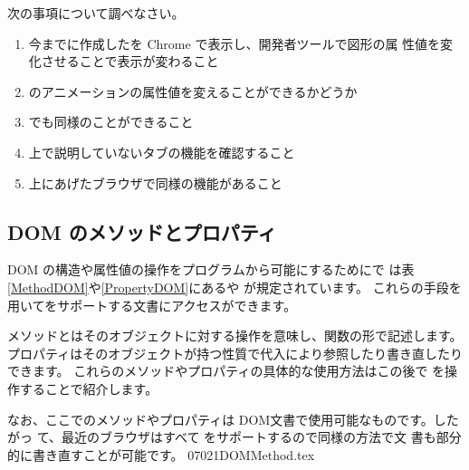\begin{Problem}\upshape
次の事項について調べなさい。
\begin{enumerate}
 \item  今までに作成した\SVG を Chrome で表示し、開発者ツールで図形の属
	性値を変化させることで表示が変わること
 \item \SVG のアニメーションの属性値を変えることができるかどうか
 \item \HTML でも同様のことができること
 \item 上で説明していないタブの機能を確認すること
 \item 上にあげたブラウザで同様の機能があること
\end{enumerate}
\end{Problem}
\subsection{DOM のメソッドとプロパティ}
DOM の構造や属性値の操作をプログラムから可能にするために\DOM で
は表\ref{MethodDOM}や\ref{PropertyDOM}にあるや
が規定されています。
これらの手段を用いて\DOM をサポートする文書にアクセスができます。

メソッドとはそのオブジェクトに対する操作を意味し、関数の形で記述します。
プロパティはそのオブジェクトが持つ性質で代入により参照したり書き直したり
できます。
%
これらのメソッドやプロパティの具体的な使用方法はこの後で
\SVG を操作することで紹介します。

なお、ここでのメソッドやプロパティは DOM文書で使用可能なものです。したがっ
て、最近のブラウザはすべて\DOM{} をサポートするので同様の方法で\HTML 文
書も部分的に書き直すことが可能です。
 \CH 07021DOMMethod.tex

